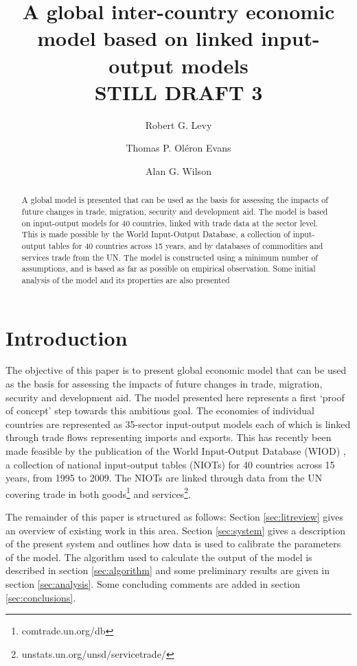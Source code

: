\documentclass[a4paper]{article}
\title{A global inter-country economic model based on linked input-output models \\ STILL DRAFT 3}
\author[*]{Robert G. Levy}
\author[**]{Thomas P. Ol\'{e}ron Evans}
\author[*]{Alan G. Wilson}
\affil[*]{Centre for Advanced Spatial Analysis, UCL Bartlett Faculty of the Built Environment,
90 Tottenham Court Road, London W1T 4TJ, UK}
\affil[**]{Department of Mathematics, University College London, Gower Street, London WC1E 6BT, UK}
\begin{document}
\maketitle

\begin{abstract}
A global model is presented that can be used as the basis for assessing the impacts of future changes in trade, migration, security and development aid.
The model is based on input-output models for 40 countries, linked with trade data at the sector level.
This is made possible by the World Input-Output Database, a collection of input-output tables for 40 countries across 15 years, and by databases of commodities and services trade from the UN.
The model is constructed using a minimum number of assumptions, and is based as far as possible on empirical observation.
Some initial analysis of the model and its properties are also presented
\end{abstract}

\section{Introduction}
The objective of this paper is to present global economic model that can be used as the basis for assessing the impacts of future changes in trade, migration, security and development aid.
The model presented here represents a first `proof of concept' step towards this ambitious goal.
The economies of individual countries are represented as 35-sector input-output models each of which is linked through trade flows representing imports and exports.
This has recently been made feasible by the publication of the World Input-Output Database (WIOD) \parencite{Timmer2012}, a collection of national input-output tables (NIOTs) for 40 countries across 15 years, from 1995 to 2009.
The NIOTs are linked through data from the UN covering trade in both goods\footnote{comtrade.un.org/db} and services\footnote{unstats.un.org/unsd/servicetrade/}.

The remainder of this paper is structured as follows: 
Section \ref{sec:litreview} gives an overview of existing work in this area.
Section \ref{sec:system} gives a description of the present system and outlines how data is used to calibrate the parameters of the model.
The algorithm used to calculate the output of the model is described in section \ref{sec:algorithm} and some preliminary results are given in section \ref{sec:analysis}.
Some concluding comments are added in section \ref{sec:conclusions}.
\end{document}
